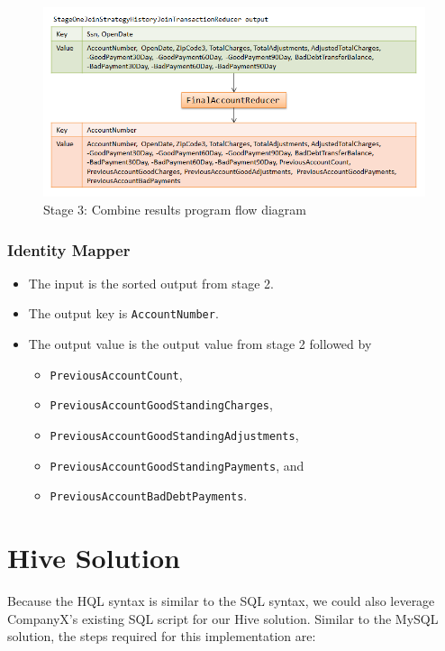 \begin{figure}[htc!]
 \centering
 \includegraphics[scale=0.60,bb=0 0 698 341]{../images/StageThree.png}
 \caption{Stage 3: Combine results program flow diagram}
 \label{fig:stage3}
\end{figure}

\subsubsection{Identity Mapper}
\begin{itemize}
 \item The input is the sorted output from stage 2. 
 \item The output key is \texttt{AccountNumber}.
 \item The output value is the output value from stage 2 followed by 
   \begin{itemize}
    \item \texttt{PreviousAccountCount},
    \item \texttt{PreviousAccountGoodStandingCharges},
    \item \texttt{PreviousAccountGoodStandingAdjustments},
    \item \texttt{PreviousAccountGoodStandingPayments}, and
    \item \texttt{PreviousAccountBadDebtPayments}.
    \end{itemize}
\end{itemize}

\section{Hive Solution}
Because the HQL syntax is similar to the SQL syntax, we could also leverage CompanyX's existing SQL script for our Hive solution. Similar to the MySQL solution, the steps required for this implementation are:

